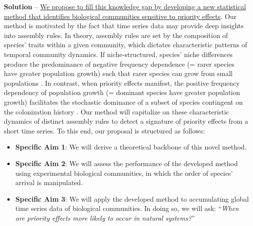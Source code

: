 \documentclass[12pt, class=article, crop=false]{standalone}
\begin{document}
\textbf{Solution} --
\ul{We propose to fill this knowledge gap by developing a new statistical method that identifies biological communities sensitive to priority effects}.
Our method is motivated by the fact that time series data may provide deep insights into assembly rules.
In theory, assembly rules are set by the composition of species' traits within a given community, which dictates characteristic patterns of temporal community dynamics.
If niche-structured, species' niche differences produce the predominance of negative frequency dependence (= rarer species have greater population growth) such that rarer species can grow from small populations \citep{loreau_does_2004, carroll_niche_2011, ke_coexistence_2018}.
In contrast, when priority effects manifest, the positive frequency dependency of population growth (= dominant species have greater population growth) facilitates the stochastic dominance of a subset of species contingent on the colonization history \citep{ke_coexistence_2018}.
Our method will capitalize on these characteristic dynamics of distinct assembly rules to detect a signature of priority effects from a short time series.
To this end, our proposal is structured as follows:

\begin{itemize}
    \item \textbf{Specific Aim 1}: We will derive a theoretical backbone of this novel method.
    \item \textbf{Specific Aim 2}: We will assess the performance of the developed method using experimental biological communities, in which the order of species' arrival is manipulated.
    \item \textbf{Specific Aim 3}: We will apply the developed method to accumulating global time series data of biological communities. In doing so, we will ask: ``\textit{When are priority effects more likely to occur in natural systems?}''
\end{itemize}
\end{document}

